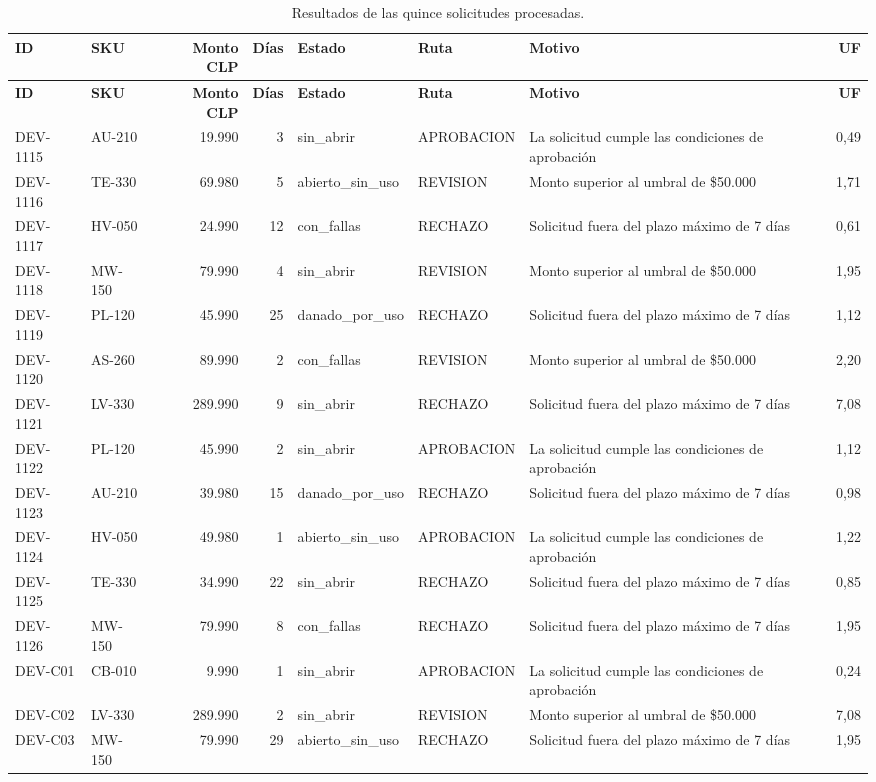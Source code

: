 \documentclass[11pt,letterpaper]{article}
\begin{document}
\begin{landscape}
\begin{longtable}{l l r r l l p{7.2cm} r}
\caption{Resultados de las quince solicitudes procesadas.}\label{tab:resultados}\\
\toprule
\textbf{ID} & \textbf{SKU} & \textbf{Monto CLP} & \textbf{Días} & \textbf{Estado} & \textbf{Ruta} & \textbf{Motivo} & \textbf{UF} \\
\midrule
\endfirsthead
\toprule
\textbf{ID} & \textbf{SKU} & \textbf{Monto CLP} & \textbf{Días} & \textbf{Estado} & \textbf{Ruta} & \textbf{Motivo} & \textbf{UF} \\
\midrule
\endhead
DEV-1115 & AU-210 & 19.990 & 3 & sin\_abrir & APROBACION & La solicitud cumple las condiciones de aprobación & 0,49 \\
DEV-1116 & TE-330 & 69.980 & 5 & abierto\_sin\_uso & REVISION & Monto superior al umbral de \$50.000 & 1,71 \\
DEV-1117 & HV-050 & 24.990 & 12 & con\_fallas & RECHAZO & Solicitud fuera del plazo máximo de 7 días & 0,61 \\
DEV-1118 & MW-150 & 79.990 & 4 & sin\_abrir & REVISION & Monto superior al umbral de \$50.000 & 1,95 \\
DEV-1119 & PL-120 & 45.990 & 25 & danado\_por\_uso & RECHAZO & Solicitud fuera del plazo máximo de 7 días & 1,12 \\
DEV-1120 & AS-260 & 89.990 & 2 & con\_fallas & REVISION & Monto superior al umbral de \$50.000 & 2,20 \\
DEV-1121 & LV-330 & 289.990 & 9 & sin\_abrir & RECHAZO & Solicitud fuera del plazo máximo de 7 días & 7,08 \\
DEV-1122 & PL-120 & 45.990 & 2 & sin\_abrir & APROBACION & La solicitud cumple las condiciones de aprobación & 1,12 \\
DEV-1123 & AU-210 & 39.980 & 15 & danado\_por\_uso & RECHAZO & Solicitud fuera del plazo máximo de 7 días & 0,98 \\
DEV-1124 & HV-050 & 49.980 & 1 & abierto\_sin\_uso & APROBACION & La solicitud cumple las condiciones de aprobación & 1,22 \\
DEV-1125 & TE-330 & 34.990 & 22 & sin\_abrir & RECHAZO & Solicitud fuera del plazo máximo de 7 días & 0,85 \\
DEV-1126 & MW-150 & 79.990 & 8 & con\_fallas & RECHAZO & Solicitud fuera del plazo máximo de 7 días & 1,95 \\
DEV-C01 & CB-010 & 9.990 & 1 & sin\_abrir & APROBACION & La solicitud cumple las condiciones de aprobación & 0,24 \\
DEV-C02 & LV-330 & 289.990 & 2 & sin\_abrir & REVISION & Monto superior al umbral de \$50.000 & 7,08 \\
DEV-C03 & MW-150 & 79.990 & 29 & abierto\_sin\_uso & RECHAZO & Solicitud fuera del plazo máximo de 7 días & 1,95 \\
\bottomrule
\end{longtable}
\end{landscape}
\end{document}
